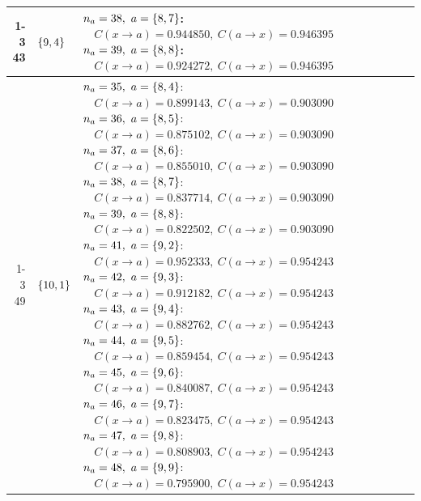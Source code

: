 \begin{longtable}{@{}r l >{\raggedright\arraybackslash}p{}@{}}
  \cmidrule(lr){1-3}
  43 & \(\left\{9,4\right\}\) & \(n_a=38,\ a=\sig{8,7}\):\newline \(\quad C(x\!\to\!a)=0.944850,\ C(a\!\to\!x)=0.946395\)\newline \(n_a=39,\ a=\sig{8,8}\):\newline \(\quad C(x\!\to\!a)=0.924272,\ C(a\!\to\!x)=0.946395\) \\
  \cmidrule(lr){1-3}
  49 & \(\left\{10,1\right\}\) & \(n_a=35,\ a=\sig{8,4}\):\newline \(\quad C(x\!\to\!a)=0.899143,\ C(a\!\to\!x)=0.903090\)\newline \(n_a=36,\ a=\sig{8,5}\):\newline \(\quad C(x\!\to\!a)=0.875102,\ C(a\!\to\!x)=0.903090\)\newline \(n_a=37,\ a=\sig{8,6}\):\newline \(\quad C(x\!\to\!a)=0.855010,\ C(a\!\to\!x)=0.903090\)\newline \(n_a=38,\ a=\sig{8,7}\):\newline \(\quad C(x\!\to\!a)=0.837714,\ C(a\!\to\!x)=0.903090\)\newline \(n_a=39,\ a=\sig{8,8}\):\newline \(\quad C(x\!\to\!a)=0.822502,\ C(a\!\to\!x)=0.903090\)\newline \(n_a=41,\ a=\sig{9,2}\):\newline \(\quad C(x\!\to\!a)=0.952333,\ C(a\!\to\!x)=0.954243\)\newline \(n_a=42,\ a=\sig{9,3}\):\newline \(\quad C(x\!\to\!a)=0.912182,\ C(a\!\to\!x)=0.954243\)\newline \(n_a=43,\ a=\sig{9,4}\):\newline \(\quad C(x\!\to\!a)=0.882762,\ C(a\!\to\!x)=0.954243\)\newline \(n_a=44,\ a=\sig{9,5}\):\newline \(\quad C(x\!\to\!a)=0.859454,\ C(a\!\to\!x)=0.954243\)\newline \(n_a=45,\ a=\sig{9,6}\):\newline \(\quad C(x\!\to\!a)=0.840087,\ C(a\!\to\!x)=0.954243\)\newline \(n_a=46,\ a=\sig{9,7}\):\newline \(\quad C(x\!\to\!a)=0.823475,\ C(a\!\to\!x)=0.954243\)\newline \(n_a=47,\ a=\sig{9,8}\):\newline \(\quad C(x\!\to\!a)=0.808903,\ C(a\!\to\!x)=0.954243\)\newline \(n_a=48,\ a=\sig{9,9}\):\newline \(\quad C(x\!\to\!a)=0.795900,\ C(a\!\to\!x)=0.954243\) \\

\end{longtable}
